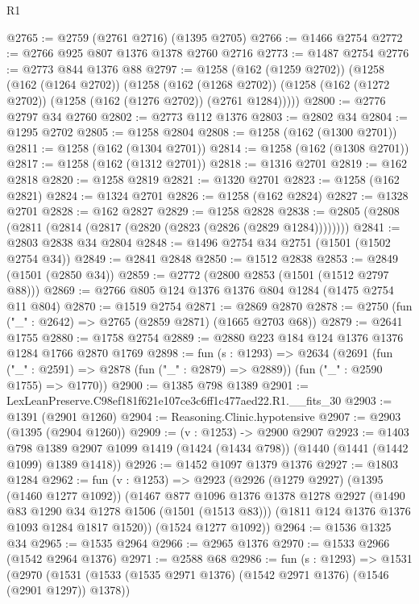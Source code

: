 \begin{lexlean}{R1}
\begin{coremodule}
@2765 := @2759 (@2761 @2716) (@1395 @2705)
@2766 := @1466 @2754
@2772 := @2766 @925 @807 @1376 @1378 @2760 @2716
@2773 := @1487 @2754
@2776 := @2773 @844 @1376 @88
@2797 := @1258
    (@162 (@1259 @2702))
    (@1258
      (@162 (@1264 @2702))
      (@1258
        (@162 (@1268 @2702))
        (@1258 (@162 (@1272 @2702)) (@1258 (@162 (@1276 @2702)) (@2761 @1284)))))
@2800 := @2776 @2797 @34 @2760
@2802 := @2773 @112 @1376
@2803 := @2802 @34
@2804 := @1295 @2702
@2805 := @1258 @2804
@2808 := @1258 (@162 (@1300 @2701))
@2811 := @1258 (@162 (@1304 @2701))
@2814 := @1258 (@162 (@1308 @2701))
@2817 := @1258 (@162 (@1312 @2701))
@2818 := @1316 @2701
@2819 := @162 @2818
@2820 := @1258 @2819
@2821 := @1320 @2701
@2823 := @1258 (@162 @2821)
@2824 := @1324 @2701
@2826 := @1258 (@162 @2824)
@2827 := @1328 @2701
@2828 := @162 @2827
@2829 := @1258 @2828
@2838 := @2805 (@2808 (@2811 (@2814 (@2817 (@2820 (@2823 (@2826 (@2829 @1284))))))))
@2841 := @2803 @2838 @34 @2804
@2848 := @1496 @2754 @34 @2751 (@1501 (@1502 @2754 @34))
@2849 := @2841 @2848
@2850 := @1512 @2838
@2853 := @2849 (@1501 (@2850 @34))
@2859 := @2772 (@2800 @2853 (@1501 (@1512 @2797 @88)))
@2869 := @2766 @805 @124 @1376 @1376 @804 @1284 (@1475 @2754 @11 @804)
@2870 := @1519 @2754
@2871 := @2869 @2870
@2878 := @2750 (fun ("_" : @2642) => @2765 (@2859 @2871) (@1665 @2703 @68))
@2879 := @2641 @1755
@2880 := @1758 @2754
@2889 := @2880 @223 @184 @124 @1376 @1376 @1284 @1766 @2870 @1769
@2898 := fun (s : @1293) =>
  @2634
    (@2691
      (fun ("_" : @2591) => @2878 (fun ("_" : @2879) => @2889))
      (fun ("_" : @2590 @1755) => @1770))
@2900 := @1385 @798 @1389
@2901 := LexLeanPreserve.C98ef181f621e107ce3c6ff1c477aed22.R1.__fits_30
@2903 := @1391 (@2901 @1260)
@2904 := Reasoning.Clinic.hypotensive
@2907 := @2903 (@1395 (@2904 @1260))
@2909 := (v : @1253) -> @2900 @2907
@2923 := @1403
    @798
    @1389
    @2907
    @1099
    @1419
    (@1424 (@1434 @798))
    (@1440 (@1441 (@1442 @1099) @1389 @1418))
@2926 := @1452 @1097 @1379 @1376
@2927 := @1803 @1284
@2962 := fun (v : @1253) =>
  @2923
    (@2926
      (@1279 @2927)
      (@1395 (@1460 @1277 @1092))
      (@1467
        @877
        @1096
        @1376
        @1378
        @1278
        @2927
        (@1490 @83 @1290 @34 @1278 @1506 (@1501 (@1513 @83)))
        (@1811 @124 @1376 @1376 @1093 @1284 @1817 @1520))
      (@1524 @1277 @1092))
@2964 := @1536 @1325 @34
@2965 := @1535 @2964
@2966 := @2965 @1376
@2970 := @1533 @2966 (@1542 @2964 @1376)
@2971 := @2588 @68
@2986 := fun (s : @1293) =>
  @1531
    (@2970
      (@1531 (@1533 (@1535 @2971 @1376) (@1542 @2971 @1376) (@1546 (@2901 @1297)) @1378))

\end{coremodule}
\end{lexlean}
